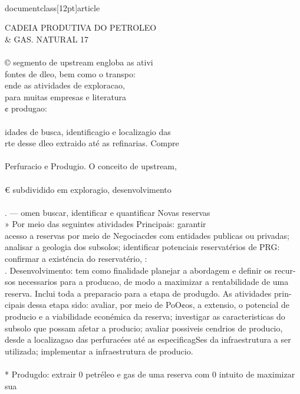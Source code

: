 \\documentclass[12pt]{article}
\begin{document}
CADEIA PRODUTIVA DO PETROLEO \\& GAS. NATURAL 17\\
\\
© segmento de upstream engloba as ativi\\
fontes de dleo, bem como o transpo:\\
ende as atividades de exploracao,\\
para muitas empresas e literatura\\
¢ produgao:\\
\\
idades de busca, identificagio e localizagio das\\
rte desse dleo extraido até as refinarias. Compre\\
\\
Perfuracio e Produgio. O conceito de upstream,\\
\\
€ subdividido em exploragio, desenvolvimento\\
\\
. — omen buscar, identificar e quantificar Novas reservas\\
» Por meio das seguintes atividades Principais: garantir\\
acesso a reservas por meio de Negociacdes com entidades publicas ou privadas;\\
analisar a geologia dos subsolos; identificar potenciais reservatérios de PRG:\\
confirmar a existéncia do reservatério, :\\
. Desenvolvimento: tem como finalidade planejar a abordagem e definir os recur-\\
sos necessarios para a producao, de modo a maximizar a rentabilidade de uma\\
reserva. Inclui toda a preparacio para a etapa de produgdo. As atividades prin-\\
cipais dessa etapa sido: avaliar, por meio de PoO¢os, a extensio, o potencial de\\
producio e a viabilidade econémica da reserva; investigar as caracteristicas do\\
subsolo que possam afetar a producio; avaliar possiveis cendrios de producio,\\
desde a localizagao das perfuracées até as especificagSes da infraestrutura a ser\\
utilizada; implementar a infraestrutura de producio.\\
\\
* Produgdo: extrair 0 petréleo e gas de uma reserva com 0 intuito de maximizar sua\\
\end{document}

